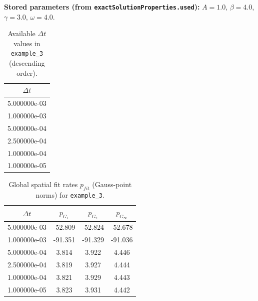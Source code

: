 \documentclass[11pt,a4paper]{article}
\begin{document}
\textbf{Stored parameters (from \texttt{exactSolutionProperties.used}):} $A=1.0$, $\beta=4.0$, $\gamma=3.0$, $\omega=4.0$.
\begin{table}[htbp]
\centering
\small
\caption{Available $\Delta t$ values in \texttt{example\_3} (descending order).}
\begin{tabular}{c}
\toprule
$\Delta t$ \\
\midrule
5.000000e-03 \\
1.000000e-03 \\
5.000000e-04 \\
2.500000e-04 \\
1.000000e-04 \\
1.000000e-05 \\
\bottomrule
\end{tabular}
\end{table}
\begin{table}[htbp]
\centering
\scriptsize
\caption{Global spatial fit rates $p_{fit}$ (cell-centered norms) for \texttt{example\_3}.}
\end{table}
\begin{table}[htbp]
\centering
\scriptsize
\caption{Global spatial fit rates $p_{fit}$ (Gauss-point norms) for \texttt{example\_3}.}
\begin{tabular}{cccc}
\toprule
$\Delta t$ & $p_{G_1}$ & $p_{G_2}$ & $p_{G_\infty}$ \\
\midrule
5.000000e-03 & -52.809 & -52.824 & -52.678 \\
1.000000e-03 & -91.351 & -91.329 & -91.036 \\
5.000000e-04 & 3.814 & 3.922 & 4.446 \\
2.500000e-04 & 3.819 & 3.927 & 4.444 \\
1.000000e-04 & 3.821 & 3.929 & 4.443 \\
1.000000e-05 & 3.823 & 3.931 & 4.442 \\
\bottomrule
\end{tabular}
\end{table}
\end{document}

